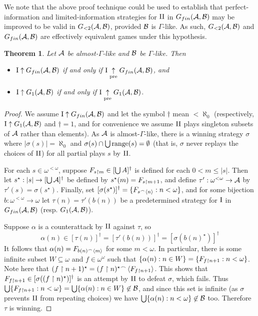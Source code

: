 \documentclass{amsart}
\theoremstyle{plain}
\newtheorem{theorem}{Theorem}
\theoremstyle{definition}
\theoremstyle{remark}
\theoremstyle{plain}
\theoremstyle{definition}
\theoremstyle{remark}
\begin{document}
We note that the above proof technique could be
used to establish that perfect-information and
limited-information strategies for \(\mathrm{II}\) in
\(G_{fin}(\mathcal{A},\mathcal{B})\) may be improved to
be valid in \(G_{<2}(\mathcal{A},\mathcal{B})\), provided
\(\mathcal{B}\) is \(\Gamma\)-like. As such,
\(G_{<2}(\mathcal{A},\mathcal{B})\) and \(G_{fin}(\mathcal{A},\mathcal{B})\)
are effectively equivalent games under this hypothesis.

\begin{theorem}\label{pawlikowskii}
Let \(\mathcal{A}\) be almost-\(\Gamma\)-like and \(\mathcal{B}\) be \(\Gamma\)-like. Then
\begin{itemize}
\item \(\mathrm{I}\uparrow G_{fin}(\mathcal{A},\mathcal{B})\) if and only if
\(\mathrm{I}\underset{\text{pre}}{\uparrow} G_{fin}(\mathcal{A},\mathcal{B})\), and
\item \(\mathrm{I}\uparrow G_1(\mathcal{A},\mathcal{B})\) if and only if
\(\mathrm{I}\underset{\text{pre}}{\uparrow} G_1(\mathcal{A},\mathcal{B})\).
\end{itemize}
\end{theorem}

\begin{proof}
We assume \(\mathrm{I}\uparrow G_{fin}(\mathcal{A},\mathcal{B})\)
and let the symbol \(\dagger\) mean \(<\aleph_0\)
(respectively, \(\mathrm{I}\uparrow G_1(\mathcal{A},\mathcal{B})\)
and \(\dagger=1\),
and for convenience we assume \(\mathrm{II}\) plays
singleton subsets of \(\mathcal{A}\) rather than elements).
As \(\mathcal{A}\) is almost-\(\Gamma\)-like, there is a 
winning strategy \(\sigma\) where
\(|\sigma(s)|=\aleph_0\) and \(\sigma(s)\cap\bigcup\text{range}(s)=\emptyset\)
(that is, \(\sigma\) never replays the choices of \(\mathrm{II}\))
for all partial plays \(s\) by \(\mathrm{II}\).

For each \(s\in\omega^{<\omega}\), suppose 
\(F_{s\restriction m}\in[\bigcup A]^{\dagger}\) 
is defined for each \(0<m\leq|s|\).
Then let \(s^\star:|s|\to[\bigcup\mathcal{A}]^{\dagger}\)
be defined by
\(s^\star(m)=F_{s\restriction m+1}\), and define \(\tau':\omega^{<\omega}\to\mathcal{A}\)
by \(\tau'(s)=\sigma(s^\star)\). Finally, set 
\([\sigma(s^\star)]^{\dagger}=\{F_{s{^\frown}\left\langle n\right\rangle}:n<\omega\}\), and
for some bijection \(b:\omega^{<\omega}\to\omega\) let \(\tau(n)=\tau'(b(n))\)
be a predetermined strategy for \(\mathrm{I}\) in \(G_{fin}(\mathcal{A},\mathcal{B})\)
(resp. \(G_1(\mathcal{A},\mathcal{B})\)).

Suppose \(\alpha\) is a counterattack by \(\mathrm{II}\) against \(\tau\), so 
\[
  \alpha(n)
    \in
  [\tau(n)]^{\dagger}
    =
  [\tau'(b(n))]^{\dagger}
    =
  [\sigma(b(n)^\star)]^{\dagger}
\]
It follows that \(\alpha(n)=F_{b(n){^\frown}\left\langle m\right\rangle}\) for some \(m<\omega\).
In particular, there is some infinite subset \(W\subseteq\omega\) and \(f\in\omega^\omega\)
such that \(\{\alpha(n):n\in W\}=\{F_{f\restriction n+1}:n<\omega\}\).
Note here that \((f\restriction n+1)^\star=(f\restriction n)^\star{^\frown}\left\langle F_{f\restriction n+1}\right\rangle\).
This shows that \(F_{f\restriction n+1}\in[\sigma((f\restriction n)^\star)]^{\dagger}\) 
is an attempt by \(\mathrm{II}\) to defeat \(\sigma\), which fails. Thus 
\(\bigcup\{F_{f\restriction n+1}:n<\omega\}=\bigcup\{\alpha(n):n\in W\}\not\in\mathcal{B}\),
and since this set is infinite (as \(\sigma\) prevents \(\mathrm{II}\)
from repeating choices) we have \(\bigcup\{\alpha(n):n<\omega\}\not\in\mathcal{B}\) too.
Therefore \(\tau\) is winning.
\end{proof}
\end{document}
